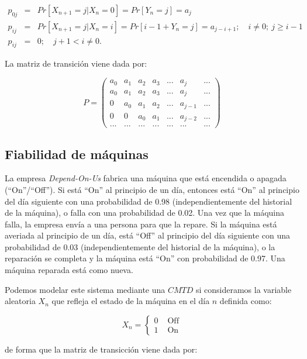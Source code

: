 \documentclass[
]{book}
\theoremstyle{definition}
\theoremstyle{definition}
\theoremstyle{definition}
\theoremstyle{definition}
\theoremstyle{remark}
\begin{document}
\begin{eqnarray*}
p_{0j} &=& Pr[X_{n+1} = j | X_{n} = 0] = Pr[Y_n = j] = a_j \\
p_{ij} &=&Pr[X_{n+1} = j | X_{n} = i] = Pr[i - 1 + Y_n = j] = a_{j-i+1}; \quad i\neq 0; \ j \geq i-1 \\
p_{ij} &=& 0; \quad j+1<i\neq0.
\end{eqnarray*}

La matriz de transición viene dada por:

\[P = 
\begin{pmatrix}
a_0 & a_1 & a_2 & a_3 &...& a_j & ...\\
a_0 & a_1 & a_2 & a_3 &...& a_j & ...\\
0 & a_0 & a_1 & a_2 &...& a_{j-1} & ...\\
0 & 0 & a_0 & a_1 &...& a_{j-2} & ...\\
... & ... & ... & ... &...& ... & ...
\end{pmatrix}\]

\hypertarget{fiabilidad}{%
\subsection{Fiabilidad de máquinas}\label{fiabilidad}}

La empresa \emph{Depend-On-Us} fabrica una máquina que está encendida o apagada (``On''/``Off''). Si está ``On'' al principio de un día, entonces está ``On'' al principio del día siguiente con una probabilidad de 0.98 (independientemente del historial de la máquina), o falla con una probabilidad de 0.02. Una vez que la máquina falla, la empresa envía a una persona para que la repare. Si la máquina está averiada al principio de un día, está ``Off'' al principio del día siguiente con una probabilidad de 0.03 (independientemente del historial de la máquina), o la reparación se completa y la máquina está ``On'' con probabilidad de 0.97. Una máquina reparada está como nueva.

Podemos modelar este sistema mediante una \(CMTD\) si consideramos la variable aleatoria \(X_n\) que refleja el estado de la máquina en el día \(n\) definida como:

\begin{equation*}
X_{n} = 
\begin{cases}
0 & \text{ Off}\\
1 & \text{ On}
\end{cases}
\end{equation*}

de forma que la matriz de transicción viene dada por:
\end{document}
